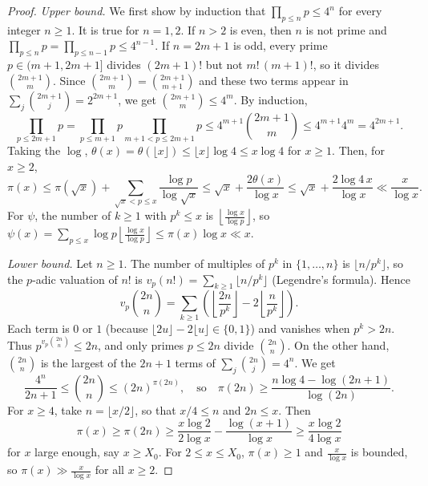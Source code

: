 \begin{proof}
    \emph{Upper bound.} We first show by induction that $\prod_{p\le n}p \le 4^n$ for every integer $n\ge1$. It is true for $n = 1,2$. If $n>2$ is even, then $n$ is not prime and $\prod_{p\le n}p = \prod_{p\le n-1}p\le 4^{n-1}$. If $n = 2m+1$ is odd, every prime $p \in (m+1,2m+1]$ divides $(2m+1)!$ but not $m!\,(m+1)!$, so it divides $\binom{2m+1}{m}$. Since $\binom{2m+1}{m} = \binom{2m+1}{m+1}$ and these two terms appear in $\sum_{j}\binom{2m+1}{j} = 2^{2m+1}$, we get $\binom{2m+1}{m}\le 4^m$. By induction,
    \begin{equation*}
        \prod_{p\le 2m+1}p = \prod_{p\le m+1}p\prod_{m+1<p\le 2m+1}p \le 4^{m+1}\binom{2m+1}{m} \le 4^{m+1}4^m = 4^{2m+1}.
    \end{equation*}
    Taking the $\log$, $\theta(x) = \theta(\lfloor x\rfloor)\le \lfloor x\rfloor\log4\le x\log 4$ for $x\ge 1$. Then, for $x\ge2$,
    \begin{equation*}
        \pi(x) \le \pi(\sqrt x) + \sum_{\sqrt x<p\le x}\frac{\log p}{\log \sqrt x} \le \sqrt x + \frac{2\theta(x)}{\log x}\le \sqrt x + \frac{2\log 4\,x}{\log x}\ll \frac{x}{\log x}.
    \end{equation*}
    For $\psi$, the number of $k\ge1$ with $p^k\le x$ is $\left\lfloor\frac{\log x}{\log p}\right\rfloor$, so $\psi(x) = \sum_{p\le x}\log p\left\lfloor\frac{\log x}{\log p}\right\rfloor\le \pi(x)\log x \ll x$.

    \emph{Lower bound.} Let $n\ge1$. The number of multiples of $p^k$ in $\{1,\dots,n\}$ is $\lfloor n/p^k\rfloor$, so the $p$-adic valuation of $n!$ is $v_p(n!) = \sum_{k\ge1}\lfloor n/p^k\rfloor$ (Legendre's formula). Hence
    \begin{equation*}
        v_p\binom{2n}{n} = \sum_{k\ge 1}\left(\left\lfloor\frac{2n}{p^k}\right\rfloor - 2\left\lfloor\frac{n}{p^k}\right\rfloor\right).
    \end{equation*}
    Each term is $0$ or $1$ (because $\lfloor 2u\rfloor-2\lfloor u\rfloor \in\{0,1\}$) and vanishes when $p^k>2n$. Thus $p^{v_p\binom{2n}{n}}\le 2n$, and only primes $p\le 2n$ divide $\binom{2n}{n}$. On the other hand, $\binom{2n}{n}$ is the largest of the $2n+1$ terms of $\sum_j\binom{2n}{j} = 4^n$. We get
    \begin{equation*}
        \frac{4^n}{2n+1}\le\binom{2n}{n}\le (2n)^{\pi(2n)}, \quad\text{so}\quad \pi(2n)\ge\frac{n\log 4-\log(2n+1)}{\log (2n)}.
    \end{equation*}
    For $x\ge4$, take $n = \lfloor x/2\rfloor$, so that $x/4\le n$ and $2n\le x$. Then
    \begin{equation*}
        \pi(x)\ge\pi(2n)\ge \frac{x\log 2}{2\log x} - \frac{\log(x+1)}{\log x} \ge \frac{x\log 2}{4\log x}
    \end{equation*}
    for $x$ large enough, say $x\ge X_0$. For $2\le x\le X_0$, $\pi(x)\ge1$ and $\frac{x}{\log x}$ is bounded, so $\pi(x)\gg \frac{x}{\log x}$ for all $x\ge2$.
\end{proof}

